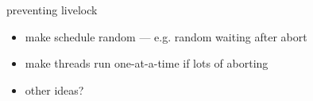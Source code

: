 
\begin{frame}{preventing livelock}
    \begin{itemize}
    \item make schedule random --- e.g. random waiting after abort
    \item make threads run one-at-a-time if lots of aborting
    \item other ideas?
    \end{itemize}
\end{frame}
